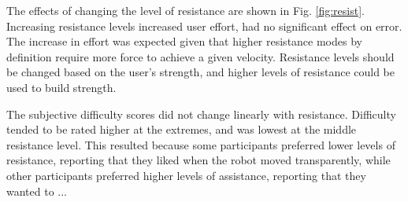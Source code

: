 \documentclass[12pt]{report}
\begin{document}

	
	
	The effects of changing the level of resistance are shown in Fig. \ref{fig:resist}. Increasing resistance levels increased user effort, had no significant effect on error. The increase in effort was expected given that higher resistance modes by definition require more force to achieve a given velocity. Resistance levels should be changed based on the user's strength, and higher levels of resistance could be used to build strength. 
	
	
	 The subjective difficulty scores did not change linearly with resistance. Difficulty tended to be rated higher at the extremes, and was lowest at the middle resistance level. This resulted because some participants preferred lower levels of resistance, reporting that they liked when the robot moved transparently, while other participants preferred higher levels of assistance, reporting that they wanted to ... 
	 
\end{document}
